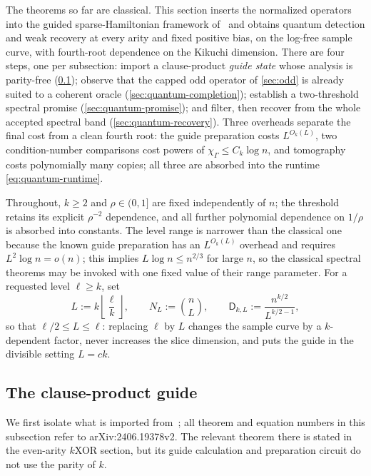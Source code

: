 \documentclass[11pt]{article}
\theoremstyle{definition}
\theoremstyle{remark}
\newcommand{\1}{\mathbf 1}
\numberwithin{equation}{section}
\begin{document}
The theorems so far are classical.  This section inserts the normalized
operators into the guided sparse-Hamiltonian framework of~\cite{SOKB} and obtains quantum
detection and weak recovery at every arity and fixed positive bias, on
the log-free sample curve, with fourth-root dependence on the Kikuchi
dimension.  There are four steps, one per subsection: import a
clause-product \emph{guide state} whose analysis is parity-free
(\cref{sec:quantum-guide}); observe that the capped odd operator of
\cref{sec:odd} is already suited to a coherent oracle
(\cref{sec:quantum-completion}); establish a two-threshold spectral
promise (\cref{sec:quantum-promise}); and filter, then recover from the
whole accepted spectral band (\cref{sec:quantum-recovery}).  Three
overheads separate the final cost from a clean fourth root: the guide
preparation costs $L^{O_k(L)}$, two condition-number comparisons cost
powers of $\chi_\Gamma\le C_k\log n$, and tomography costs polynomially
many copies; all three are absorbed into the runtime
\cref{eq:quantum-runtime}.

Throughout, $k\ge2$ and $\rho\in(0,1]$ are fixed independently of $n$;
the threshold retains its explicit $\rho^{-2}$ dependence, and all
further polynomial dependence on $1/\rho$ is absorbed into constants.
The level range is narrower than the classical one because the known
guide preparation has an $L^{O_k(L)}$ overhead and requires
$L^2\log n=o(n)$; this implies $L\log n\le n^{2/3}$ for large $n$, so
the classical spectral theorems may be invoked with one fixed value of
their range parameter.  For a requested level $\ell\ge k$, set
\begin{equation}\label{eq:quantum-divisible-level}
        L:=k\left\lfloor\frac\ell k\right\rfloor,
        \qquad N_L:=\binom nL,
        \qquad \mathsf D_{k,L}:=\frac{n^{k/2}}{L^{k/2-1}},
\end{equation}
so that $\ell/2\le L\le\ell$: replacing $\ell$ by $L$ changes the
sample curve by a $k$-dependent factor, never increases the slice
dimension, and puts the guide in the divisible setting $L=ck$.

\subsection{The clause-product guide}\label{sec:quantum-guide}

We first isolate what is imported from~\cite{SOKB}; all theorem and
equation numbers in this subsection refer to arXiv:2406.19378v2.  The
relevant theorem there is stated in the even-arity $k$XOR section, but
its guide calculation and preparation circuit do not use the parity of
$k$.
\end{document}
